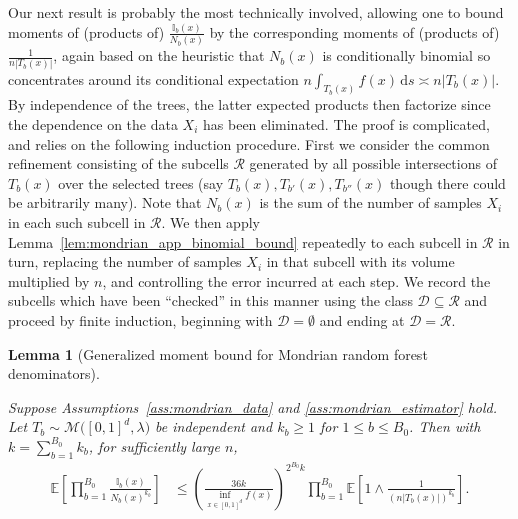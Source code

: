 \documentclass[11pt,lof]{puthesis}
\newcommand{\E}{\ensuremath{\mathbb{E}}}
\newcommand{\I}{\ensuremath{\mathbb{I}}}
\newcommand{\cR}{\ensuremath{\mathcal{R}}}
\newcommand{\cM}{\ensuremath{\mathcal{M}}}
\newcommand{\cD}{\ensuremath{\mathcal{D}}}
\newcommand{\diff}[1]{\,\mathrm{d}#1}
\theoremstyle{break}
\newtheorem{lemma}{Lemma}[section]
\theoremstyle{proof}
\begin{document}
Our next result is probably the most technically involved,
allowing one to bound moments of
(products of) $\frac{\I_b(x)}{N_b(x)}$ by the corresponding moments of
(products of) $\frac{1}{n |T_b(x)|}$, again based on the heuristic
that $N_b(x)$ is conditionally binomial so concentrates around
its conditional expectation
$n \int_{T_b(x)} f(x) \diff s \asymp n |T_b(x)|$.
By independence of the trees,
the latter expected products then factorize
since the dependence on the data $X_i$ has been eliminated.
The proof is complicated, and relies on the following induction procedure.
First we consider the common refinement consisting of the
subcells $\cR$ generated by all possible intersections
of $T_b(x)$ over the selected trees
(say $T_{b}(x), T_{b'}(x), T_{b''}(x)$
though there could be arbitrarily many).
Note that $N_b(x)$ is the sum of the number of
samples $X_i$ in each such subcell in $\cR$.
We then apply Lemma~\ref{lem:mondrian_app_binomial_bound} repeatedly
to each subcell in $\cR$ in turn, replacing
the number of samples $X_i$ in that subcell with its volume
multiplied by $n$, and controlling the error incurred at each step.
We record the subcells which have been ``checked'' in this manner
using the class $\cD \subseteq \cR$ and proceed by finite induction,
beginning with $\cD = \emptyset$ and ending at $\cD = \cR$.

\begin{lemma}[Generalized moment bound for
Mondrian random forest denominators]%
\label{lem:mondrian_app_moment_denominator}

Suppose Assumptions~\ref{ass:mondrian_data}
and \ref{ass:mondrian_estimator} hold.
Let $T_b \sim \cM\big([0,1]^d, \lambda\big)$
be independent and $k_b \geq 1$ for $1 \leq b \leq B_0$.
Then with $k = \sum_{b=1}^{B_0} k_b$,
for sufficiently large $n$,
%
\begin{align*}
\E\left[
\prod_{b=1}^{B_0}
\frac{\I_b(x)}{N_b(x)^{k_b}}
\right]
&\leq
\left( \frac{36k}{\inf_{x \in [0,1]^d} f(x)} \right)^{2^{B_0} k}
\prod_{b=1}^{B_0}
\E \left[
1 \wedge
\frac{1}{(n |T_b(x)|)^{k_b}}
\right].
\end{align*}
\end{lemma}
\end{document}
